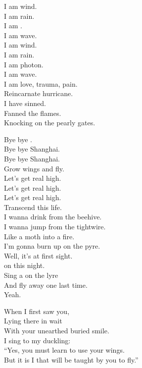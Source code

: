 
I am wind. \\
I am rain. \\
I am . \\
I am wave. \\
I am wind. \\
I am rain. \\
I am photon. \\
I am wave. \\
I am love, trauma, pain. \\
Reincarnate hurricane. \\
I have sinned. \\
Fanned the flames. \\
Knocking on the pearly gates. \\





Bye bye . \\
Bye bye Shanghai. \\
Bye bye Shanghai. \\
Grow wings and fly. \\
Let's get real high. \\
Let's get real high. \\
Let's get real high. \\
Transcend this life. \\

I wanna drink from the beehive. \\
I wanna jump from the tightwire. \\
Like a moth into a fire. \\
I'm gonna burn up on the pyre. \\
Well, it's  at first sight. \\
 on this night. \\
Sing a  on the lyre \\
And fly away one last time. \\
Yeah. \\


When I first saw you, \\
Lying there in wait \\
With your unearthed buried smile. \\
I sing to my duckling: \\
``Yes, you must learn to use your wings. \\
But it is I that will be taught by you to fly.'' \\

